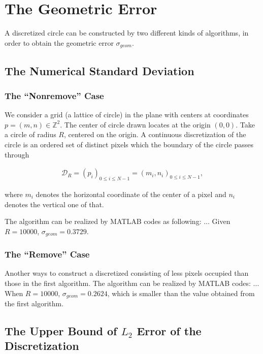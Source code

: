 \documentclass[letterpaper]{article}
\numberwithin{equation}{section} %
\numberwithin{figure}{section} %
\numberwithin{table}{section} %
\begin{document}
\section{The Geometric Error}

A discretized circle can be constructed by two different kinds of algorithms, in order to obtain the geometric error $\sigma_{geom}$. 

\subsection{The Numerical Standard Deviation}

\subsubsection{The \enquote{Nonremove} Case}
We consider a grid (a lattice of circle) in the plane with centers at coordinates $p=(m, n)\in\mathbb{Z}^2$. The center of circle drawn locates at the origin $(0,0)$. Take a circle of radius $R$, centered on the origin. A continuous discretization of the circle is an ordered set of distinct pixels which the boundary of the circle passes through

\begin{align} 
\mathcal{D}_R=(p_{i})_{0 \leq i \leq N-1} = (m_i, n_i)_{0 \leq i \leq N-1},
\end{align}

\noindent
where $m_i$ denotes the horizontal coordinate of the center of a pixel and $n_i$ denotes the vertical one of that.

The algorithm can be realized by MATLAB codes as following: ... Given $R=10000$, $\sigma_{geom}=0.3729$.

	
\subsubsection{The \enquote{Remove} Case}

Another ways to construct a discretized consisting of less pixels occupied than those in the first algorithm. The algorithm can be realized by MATLAB codes: ... When $R=10000$, $\sigma_{geom}=0.2624$, which is smaller than the value obtained from the first algorithm.

\subsection{The Upper Bound of $L_{2}$ Error of the Discretization}
\end{document}
